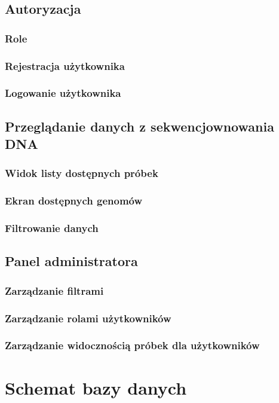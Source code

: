 \documentclass[a4paper,12pt,twoside]{article}
\begin{document}
\subsection{Autoryzacja}
\subsubsection{Role}
\subsubsection{Rejestracja użytkownika}
\subsubsection{Logowanie użytkownika}

\subsection{Przeglądanie danych z sekwencjownowania DNA}
\subsubsection{Widok listy dostępnych próbek}
\subsubsection{Ekran dostępnych genomów}
\subsubsection{Filtrowanie danych}

\subsection{Panel administratora}
\subsubsection{Zarządzanie filtrami}
\subsubsection{Zarządzanie rolami użytkowników}
\subsubsection{Zarządzanie widocznością próbek dla użytkowników}
\newpage
\section{Schemat bazy danych}
\newpage
\end{document}
